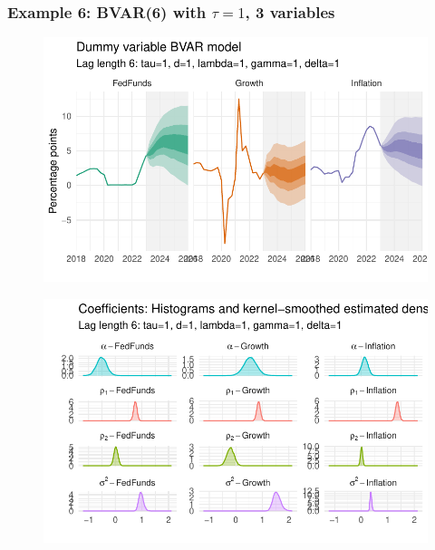\documentclass[
  letterpaper,
]{book}
\begin{document}
\hypertarget{example-6-bvar6-with-tau1-3-variables}{%
\subsubsection{\texorpdfstring{Example 6: BVAR(6) with \(\tau=1\), 3
variables}{Example 6: BVAR(6) with \textbackslash tau=1, 3 variables}}\label{example-6-bvar6-with-tau1-3-variables}}

\begin{figure}

{\centering \includegraphics{./BVAR_files/figure-pdf/estim-1.pdf}

}

\end{figure}

\begin{figure}

{\centering \includegraphics{./BVAR_files/figure-pdf/unnamed-chunk-14-1.pdf}

}

\end{figure}
\end{document}
